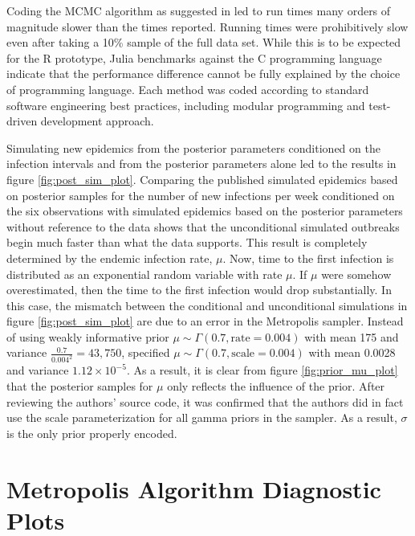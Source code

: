 \documentclass{uwstat572}
\begin{document}
Coding the MCMC algorithm as suggested in \citet{Brown} led to run times many orders of magnitude slower than the times reported. 
Running times were prohibitively slow even after taking a 10\% sample of the full data set. 
While this is to be expected for the R prototype, Julia benchmarks against the C programming language indicate that the performance difference cannot be fully explained by the choice of programming language. 
Each method was coded according to standard software engineering best practices, including modular programming and test-driven development approach.  

Simulating new epidemics from the posterior parameters conditioned on the infection intervals and from the posterior parameters alone led \citet{Brown} to the results in figure \ref{fig:post_sim_plot}. 
Comparing the published simulated epidemics based on posterior samples for the number of new infections per week conditioned on the six observations with simulated epidemics based on the posterior parameters without reference to the data shows that the unconditional simulated outbreaks begin much faster than what the data supports. 
This result is completely determined by the endemic infection rate, $\mu$. 
Now, time to the first infection is distributed as an exponential random variable with rate $\mu$. 
If $\mu$ were somehow overestimated, then the time to the first infection would drop substantially.
In this case, the mismatch between the conditional and unconditional simulations in figure \ref{fig:post_sim_plot} are due to an error in the Metropolis sampler. 
Instead of using weakly informative prior $\mu \sim \Gamma(0.7, \text{rate}=0.004)$ with mean 175 and variance $\frac{0.7}{0.004^2}=43,750$, \citep{Brown} specified $\mu \sim \Gamma(0.7, \text{scale}=0.004)$ with mean 0.0028 and variance $1.12\times10^{-5}$. 
As a result, it is clear from figure \ref{fig:prior_mu_plot} that the posterior samples for $\mu$ only reflects the influence of the prior. 
After reviewing the authors' source code, it was confirmed that the authors did in fact use the scale parameterization for all gamma priors in the sampler. 
As a result, $\sigma$ is the only prior properly encoded. 

\newpage


\newpage
\appendix
\section{Metropolis Algorithm Diagnostic Plots}
\label{metropolis_plots}
\end{document}
